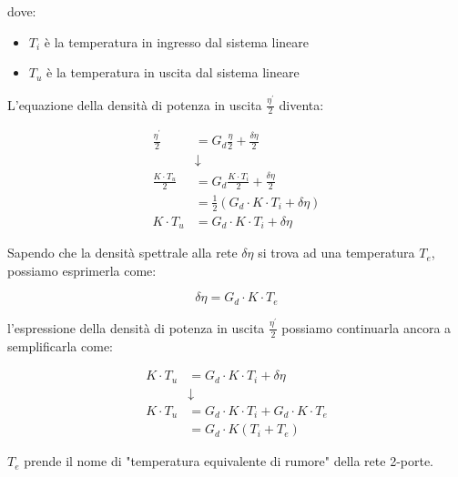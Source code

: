 dove: 
\begin{itemize}
    \item $T_i$ è la temperatura in ingresso dal sistema lineare 
    \item $T_u$ è la temperatura in uscita dal sistema lineare
\end{itemize}

L'equazione della densità di potenza in uscita $ \frac{\eta^{'}}{2}$ diventa: 

{
    \Large 
    \begin{equation}
        \begin{split}
        \frac{\eta^{'}}{2} 
        &= 
        G_d \frac{\eta}{2} + \frac{\delta \eta}{2}     
       \\
       &\downarrow
       \\ 
       \frac{K \cdot T_u}{2} 
        &= 
        G_d \frac{K \cdot T_i}{2} + \frac{\delta \eta}{2}   
        \\
        &= 
        \frac{1}{2} (G_d \cdot K \cdot T_i + \delta \eta)
        \\     
        K \cdot T_u
        &= 
        G_d \cdot K \cdot T_i + \delta \eta
    \end{split}
    \end{equation}
}

Sapendo che la densità spettrale alla rete $\delta \eta$ si trova ad una temperatura $T_e$, possiamo esprimerla come: 

{
    \Large 
    \begin{equation}
        \delta \eta = G_d \cdot K \cdot T_e
    \end{equation}
}

l'espressione della densità di potenza in uscita $\frac{\eta^{'}}{2}$ possiamo continuarla ancora a semplificarla come: 

{
    \Large 
    \begin{equation}
        \begin{split}
        K \cdot T_u
        &= 
        G_d \cdot K \cdot T_i + \delta \eta
        \\
        &\downarrow
        \\
        K \cdot T_u
        &= 
        G_d \cdot K \cdot T_i + G_d \cdot K \cdot T_e
        \\
        &= 
        G_d \cdot K (T_i + T_e)
    \end{split}
    \end{equation}
}

$T_e$ prende il nome di "temperatura equivalente di rumore" della rete 2-porte. \newline 

